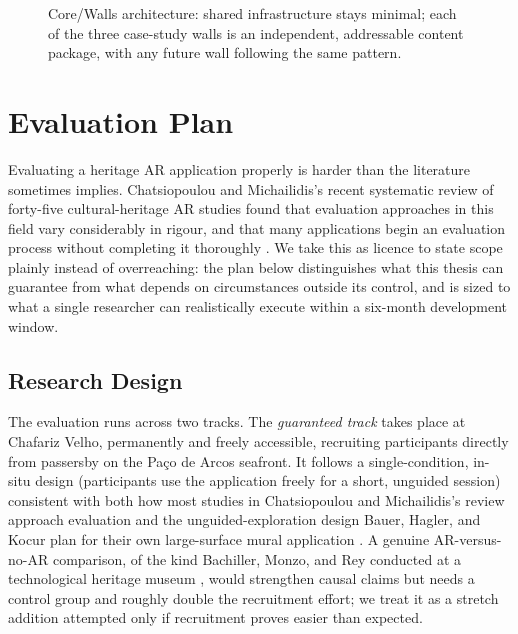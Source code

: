 \begin{aitemize}[nosep]
\begin{figure}[h]
{%
}
\caption{Core/Walls architecture: shared infrastructure stays minimal; each of the three case-study walls is an independent, addressable content package, with any future wall following the same pattern.}
\label{fig:architecture}
\end{figure}















\section{Evaluation Plan}
\label{sec:pw-evaluation}
 
Evaluating a heritage AR application properly is harder than the
literature sometimes implies. Chatsiopoulou and Michailidis's recent
systematic review of forty-five cultural-heritage AR studies found that
evaluation approaches in this field vary considerably in rigour, and that
many applications begin an evaluation process without completing it
thoroughly \cite{chatsiopoulou2025}. We take this as licence to state
scope plainly instead of overreaching: the plan below distinguishes
what this thesis can guarantee from what depends on circumstances outside
its control, and is sized to what a single researcher can realistically
execute within a six-month development window.
 
\subsection{Research Design}
\label{subsec:pw-research-design}
 
The evaluation runs across two tracks. The \emph{guaranteed track} takes
place at Chafariz Velho, permanently and freely accessible, recruiting
participants directly from passersby on the Pa\c{c}o de Arcos seafront.
It follows a single-condition, in-situ design (participants use the application freely for a short, unguided session) consistent with
both how most studies in Chatsiopoulou and Michailidis's review approach
evaluation and the unguided-exploration design Bauer, Hagler, and Kocur
plan for their own large-surface mural application
\cite{chatsiopoulou2025,bauer2025}. A genuine AR-versus-no-AR comparison,
of the kind Bachiller, Monzo, and Rey conducted at a technological
heritage museum \cite{bachiller2023}, would strengthen causal claims but
needs a control group and roughly double the recruitment effort; we treat
it as a stretch addition attempted only if recruitment proves easier than
expected.


\end{aitemize}
